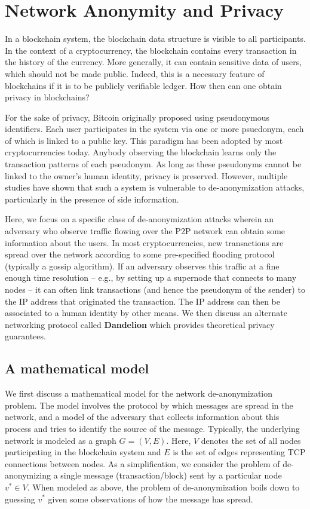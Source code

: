 \documentclass{article}
\begin{document}
\section*{Network Anonymity and Privacy}
In a blockchain system, the blockchain data structure is visible to all participants. In the context of a cryptocurrency, the blockchain contains every transaction in the history of the currency. More generally, it can contain sensitive data of users, which should not be made public. Indeed, this is a necessary feature of blockchains if it is to be publicly verifiable ledger. How then can one obtain privacy in blockchains?

For the sake of privacy, Bitcoin originally proposed using pseudonymous identifiers. Each user participates in the system via one or more psuedonym, each of which is linked to a public key. This paradigm has been adopted by most cryptocurrencies today. Anybody observing the blockchain learns only the transaction patterns of each pseudonym. As long as these pseudonyms cannot be linked to the owner's human identity, privacy is preserved. However, multiple studies have shown that such a system is vulnerable to de-anonymization attacks, particularly in the presence of side information. %

Here, we focus on a specific class of de-anonymization attacks wherein an adversary who observe traffic flowing over the P2P network can obtain some information about the users. In most cryptocurrencies, new transactions are spread over the network according to some pre-specified flooding protocol (typically a gossip algorithm). If an adversary observes this traffic at a fine enough time resolution -- e.g., by setting up a supernode that connects to many nodes -- it can often link transactions (and hence the pseudonym of the sender) to the IP address that originated the transaction. The IP address can then be associated to a human identity by other means. We then discuss an alternate networking protocol called \textbf{Dandelion} which provides theoretical privacy guarantees.

\subsection*{A mathematical model}
We first discuss a mathematical model for the network de-anonymization problem. The model involves the protocol by which messages are spread in the network, and a model of the adversary that collects information about this process and tries to identify the source of the message. Typically, the underlying network is modeled as a graph $G = (V,E)$. Here, $V$ denotes the set of all nodes participating in the blockchain system and $E$ is the set of edges representing TCP connections between nodes. As a simplification, we consider the problem of de-anonymizing a single message (transaction/block) sent by a particular node $v^* \in V$. When modeled as above, the problem of de-anonymization boils down to guessing $v^*$ given some observations of how the message has spread. 
\end{document}
